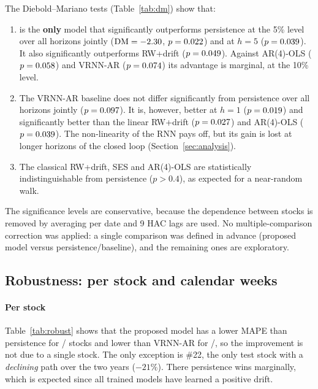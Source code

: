 The Diebold--Mariano tests (Table~\ref{tab:dm}) show that:
\begin{enumerate}[leftmargin=*]
  \item \PropName{} is the \textbf{only} model that significantly outperforms persistence at the 5\% level over all horizons jointly ($\mathrm{DM}=-2.30$, $p=0.022$) and at $h=5$ ($p=0.039$). It also significantly outperforms RW+drift ($p=0.049$). Against AR(4)-OLS ($p=0.058$) and VRNN-AR ($p=0.074$) its advantage is marginal, at the 10\% level.
  \item The VRNN-AR baseline does not differ significantly from persistence over all horizons jointly ($p=0.097$). It is, however, better at $h=1$ ($p=0.019$) and significantly better than the linear RW+drift ($p=0.027$) and AR(4)-OLS ($p=0.039$). The non-linearity of the RNN pays off, but its gain is lost at longer horizons of the closed loop (Section~\ref{sec:analysis}).
  \item The classical RW+drift, SES and AR(4)-OLS are statistically indistinguishable from persistence ($p>0.4$), as expected for a near-random walk.
\end{enumerate}
The significance levels are conservative, because the dependence between stocks is removed by averaging per date and 9 HAC lags are used. No multiple-comparison correction was applied: a single comparison was defined in advance (proposed model versus persistence/baseline), and the remaining ones are exploratory.

\subsection{Robustness: per stock and calendar weeks}


\paragraph{Per stock}
Table~\ref{tab:robust} shows that the proposed model has a lower MAPE than persistence for \PropBeatsPersStocks/\NtestStocks{} stocks and lower than VRNN-AR for \PropBeatsVrnnStocks/\NtestStocks, so the improvement is not due to a single stock. The only exception is \#22, the only test stock with a \emph{declining} path over the two years ($-21\%$). There persistence wins marginally, which is expected since all trained models have learned a positive drift.

